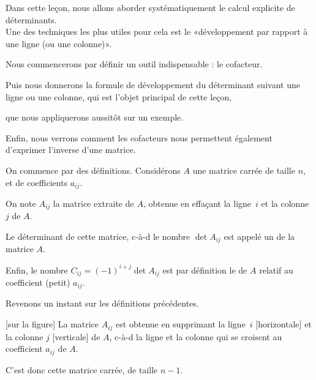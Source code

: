 







\debuttexte


\diapo

\change
Dans cette leçon, nous allons aborder systématiquement le calcul explicite de déterminants. 
\\
Une des techniques les plus utiles pour cela est le 
«dévelop\-pement par rapport à une ligne (ou une colonne)».

\change
Nous commencerons par définir  un outil indispensable : le cofacteur.

\change
Puis nous donnerons la formule de développement du déterminant suivant une ligne ou une colonne, qui est l'objet principal de cette leçon,

\change
que nous appliquerons aussitôt sur un exemple.

\change
Enfin, nous verrons comment les cofacteurs nous permettent également d'exprimer l'inverse d'une matrice.

\diapo
On commence par des définitions. Considérons $A$ une matrice carrée de taille $n$, 
et de  coefficients $a_{ij}$.

\change
On note $A_{ij}$ la matrice extraite de $A$, obtenue en effaçant la ligne~$i$ et la colonne $j$ de $A$.

\change
Le déterminant de cette matrice, c-à-d le nombre $\det A_{ij}$ est appelé un  de la matrice $A$.

\change
Enfin, le nombre $C_{ij} = (-1)^{i+j}\det A_{ij}$ est par définition le  de $A$ 
relatif au coefficient (petit) $a_{ij}$.

\diapo

Revenons un instant sur les définitions précédentes.

\change

[sur la figure]  La matrice $A_{ij}$ est obtenue en supprimant la ligne~$i$ [horizontale]
et la colonne $j$ [verticale] de $A$, c-à-d la ligne et la colonne qui se croisent 
au coefficient $a_{ij}$ de $A$.

\change
C'est donc cette matrice carrée, de taille $n-1$.

